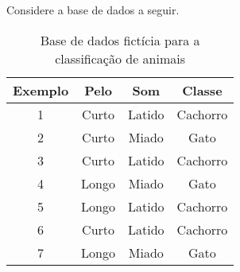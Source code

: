 \documentclass[12pt,a4paper, brazil]{article}
\begin{document}
Considere a base de dados a seguir.

\begin{table}[ht]
    \centering
    \begin{tabular}{|c|c|c|c|}
    \hline
    Exemplo & Pelo & Som & Classe \\
    \hline
    1 & Curto & Latido & Cachorro \\
    2 & Curto & Miado & Gato \\
    3 & Curto & Latido & Cachorro \\
    4 & Longo & Miado & Gato \\
    5 & Longo & Latido & Cachorro \\
    6 & Curto & Latido & Cachorro \\
    7 & Longo & Miado & Gato \\
    \hline
    \end{tabular}
    \caption{Base de dados fictícia para a classificação de animais}
    \label{tab:base-de-dados}
\end{table}


\printbibliography
\end{document}
